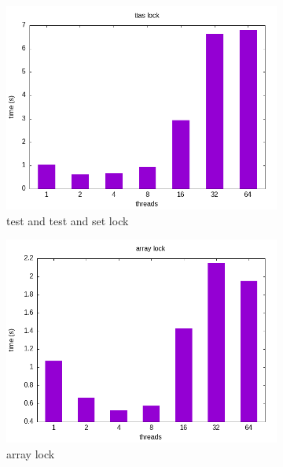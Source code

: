 \documentclass{article}
\newcommand{\eng}[1]{#1}
\begin{document}
\begin{figure}
    \centering
    \ContinuedFloat
    \begin{subfigure}{0.45\textwidth}
        \includegraphics[width=\textwidth]{a3/plots/ttas_lock.png}
        \caption{\eng{test and test and set lock}}
        \label{fig:ttas}
    \end{subfigure}
    \begin{subfigure}{0.45\textwidth}
        \includegraphics[width=\textwidth]{a3/plots/array_lock.png}
        \caption{\eng{array lock}}
        \label{fig:array}
    \end{subfigure}
    \vspace{1em}
    \begin{subfigure}{0.6\textwidth}

\end{subfigure}
\end{figure}
\end{document}
